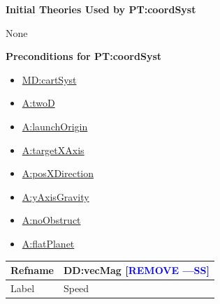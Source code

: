 \documentclass[12pt]{article}
\newcommand{\authornote}[3]{\textcolor{#1}{[#3 ---#2]}}
\newcommand{\authornote}[3]{}
\newcommand{\wss}[1]{\authornote{blue}{SS}{#1}}
\begin{document}
\noindent \textbf{Initial Theories Used by PT:coordSyst}

None

\noindent \textbf{Preconditions for PT:coordSyst}

\begin{itemize}
\item \hyperref[MD:cartSyst]{MD:cartSyst}
\item \hyperref[twoD]{A:twoD}
\item \hyperref[launchOrigin]{A:launchOrigin}
\item \hyperref[targetXAxis]{A:targetXAxis}
\item \hyperref[posXDirection]{A:posXDirection}
\item \hyperref[yAxisGravity]{A:yAxisGravity}
\item \hyperref[noObstruct]{A:noObstruct}
\item \hyperref[flatPlanet]{A:flatPlanet}
\end{itemize}

\medskip
\noindent
\begin{minipage}{\textwidth}
\begin{tabular}{>{\raggedright}p{}>{\raggedright\arraybackslash}p{}}
\toprule \textbf{Refname} & \textbf{DD:vecMag} \wss{REMOVE}
\label{DD:vecMag}
\\ \midrule
Label & Speed        
\\ \bottomrule
\end{tabular}
\end{minipage}
\end{document}
